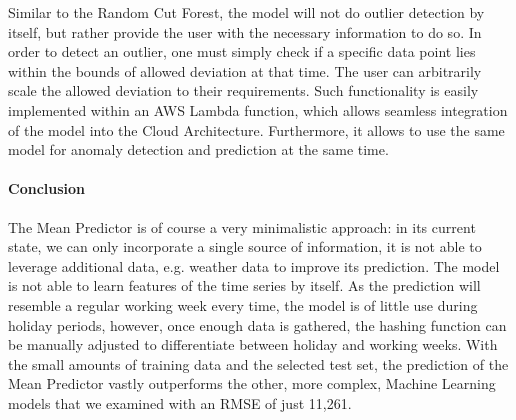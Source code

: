 Similar to the Random Cut Forest, the model will not do outlier detection by itself, but rather provide the user with the necessary information to do so. In order to detect an outlier, one must simply check if a specific data point lies within the bounds of allowed deviation at that time. The user can arbitrarily scale the allowed deviation to their requirements. Such functionality is easily implemented within an AWS Lambda function, which allows seamless integration of the model into the Cloud Architecture. Furthermore, it allows to use the same model for anomaly detection and prediction at the same time.

\paragraph{Conclusion}
The Mean Predictor is of course a very minimalistic approach: in its current state, we can only incorporate a single source of information, it is not able to leverage additional data, e.g. weather data to improve its prediction. The model is not able to learn features of the time series by itself. As the prediction will resemble a regular working week every time, the model is of little use during holiday periods, however, once enough data is gathered, the hashing function can be manually adjusted to differentiate between holiday and working weeks. With the small amounts of training data and the selected test set, the prediction of the Mean Predictor vastly outperforms the other, more complex, Machine Learning models that we examined with an RMSE of just 11,261.